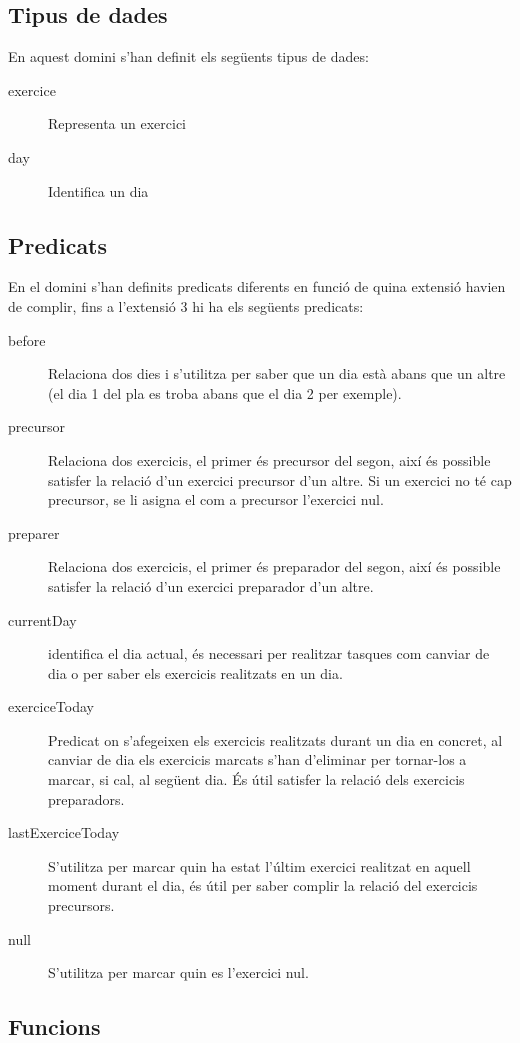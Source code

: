 \documentclass[a4paper,12pt, UTF-8]{article}
\begin{document}
\subsection{Tipus de dades}

En aquest domini s'han definit els següents tipus de dades:
\begin{description}
	\item[exercice] Representa un exercici
	\item[day] Identifica un dia
\end{description}

\subsection{Predicats}

En el domini s'han definits predicats diferents en funció de quina extensió havien de complir, fins a l'extensió 3 hi ha els següents predicats:
\begin{description}
	\item[before] Relaciona dos dies i s'utilitza per saber que un dia està abans que un altre (el dia 1 del pla es troba abans que el dia 2 per exemple).
	\item[precursor] Relaciona dos exercicis, el primer és precursor del segon, així és possible satisfer la relació d'un exercici precursor d'un altre. Si un exercici no té cap precursor, se li asigna el com a precursor l'exercici nul.
	\item[preparer] Relaciona dos exercicis, el primer és preparador del segon, així és possible satisfer la relació d'un exercici preparador d'un altre.
	\item[currentDay] identifica el dia actual, és necessari per realitzar tasques com canviar de dia o per saber els exercicis realitzats en un dia.
	\item[exerciceToday] Predicat on s'afegeixen els exercicis realitzats durant un dia en concret, al canviar de dia els exercicis marcats s'han d'eliminar per tornar-los a marcar, si cal, al següent dia. És útil satisfer la relació dels exercicis preparadors.
	\item[lastExerciceToday] S'utilitza per marcar quin ha estat l'últim exercici realitzat en aquell moment durant el dia, és útil per saber complir la relació del exercicis precursors. 
	\item[null] S'utilitza per marcar quin es l'exercici nul.
\end{description}

\subsection{Funcions}
\end{document}
